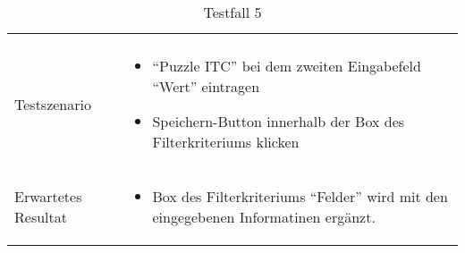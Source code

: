 \newpage

\begin{table}[h!]
   \begin{tabular}{|L{0.4\textwidth}|L{0.6\textwidth}|}
       \hline
         \\[12pt]
       Testszenario & 
       \begin{itemize}
         \item ``Puzzle ITC'' bei dem zweiten Eingabefeld ``Wert'' eintragen  
         \item Speichern-Button innerhalb der Box des Filterkriteriums klicken
       \end{itemize} \\
       \hline
       Erwartetes Resultat & 
       \begin{itemize}
         \item Box des Filterkriteriums ``Felder'' wird mit den eingegebenen Informatinen ergänzt.
      \end{itemize} \\
     \hline 
     \end{tabular}
     \caption{Testfall 5}
\end{table}

\newpage

